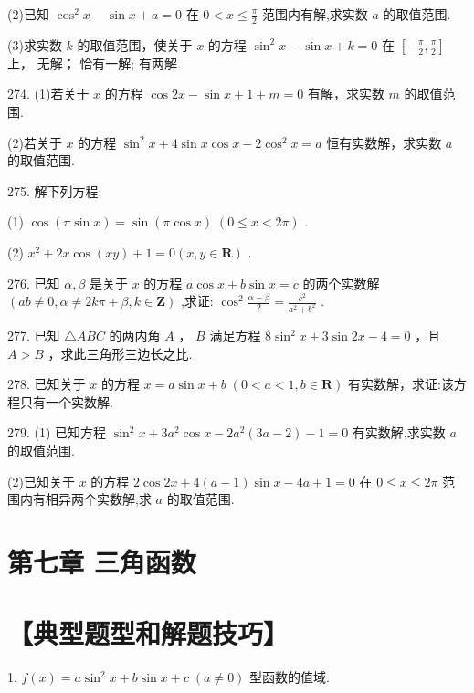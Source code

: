 \documentclass[10pt]{article}
\newcommand*\circled[1]{\tikz[baseline=(char.base)]{\node[shape=circle,draw,inner sep=1.5pt] (char) {\small #1};}}
\begin{document}
(2)已知 \({\cos }^{2}x - \sin x + a = 0\) 在 \(0 < x \leq  \frac{\pi }{2}\) 范围内有解,求实数 \(a\) 的取值范围.

(3)求实数 \(k\) 的取值范围，使关于 \(x\) 的方程 \({\sin }^{2}x - \sin x + k = 0\) 在 \(\left\lbrack  {-\frac{\pi }{2},\frac{\pi }{2}}\right\rbrack\) 上， \circled{1} 无解；  \circled{2} 恰有一解;  \circled{3} 有两解.

274. (1)若关于 \(x\) 的方程 \(\cos {2x} - \sin x + 1 + m = 0\) 有解，求实数 \(m\) 的取值范围.

(2)若关于 \(x\) 的方程 \({\sin }^{2}x + 4\sin x\cos x - 2{\cos }^{2}x = a\) 恒有实数解，求实数 \(a\) 的取值范围.

275. 解下列方程:

(1) \(\cos \left( {\pi \sin x}\right)  = \sin \left( {\pi \cos x}\right) \;\left( {0 \leq  x < {2\pi }}\right)\) .

(2) \({x}^{2} + {2x}\cos \left( {xy}\right)  + 1 = 0\left( {x,y \in  \mathbf{R}}\right)\) .

276. 已知 \(\alpha ,\beta\) 是关于 \(x\) 的方程 \(a\cos x + b\sin x = c\) 的两个实数解 \(\left( {{ab} \neq  0,\alpha  \neq  {2k\pi } + \beta ,k \in  \mathbf{Z}}\right)\) ,求证: \({\cos }^{2}\frac{\alpha  - \beta }{2} = \frac{{c}^{2}}{{a}^{2} + {b}^{2}}\) .

277. 已知 \(\bigtriangleup  {ABC}\) 的两内角 \(A\) ， \(B\) 满足方程 \(8{\sin }^{2}x + 3\sin {2x} - 4 = 0\) ，且 \(A > B\) ，求此三角形三边长之比.

278. 已知关于 \(x\) 的方程 \(x = a\sin x + b\;\left( {0 < a < 1,b \in  \mathbf{R}}\right)\) 有实数解，求证:该方程只有一个实数解.

279. (1) 已知方程 \({\sin }^{2}x + 3{a}^{2}\cos x - 2{a}^{2}\left( {{3a} - 2}\right)  - 1 = 0\) 有实数解,求实数 \(a\) 的取值范围.

(2)已知关于 \(x\) 的方程 \(2\cos {2x} + 4\left( {a - 1}\right) \sin x - {4a} + 1 = 0\) 在 \(0 \leq  x \leq  {2\pi }\) 范围内有相异两个实数解,求 \(a\) 的取值范围.

\section*{第七章 三角函数}

\section*{【典型题型和解题技巧】}

1. \(f\left( x\right)  = a{\sin }^{2}x + b\sin x + c\;\left( {a \neq  0}\right)\) 型函数的值域.
\end{document}

